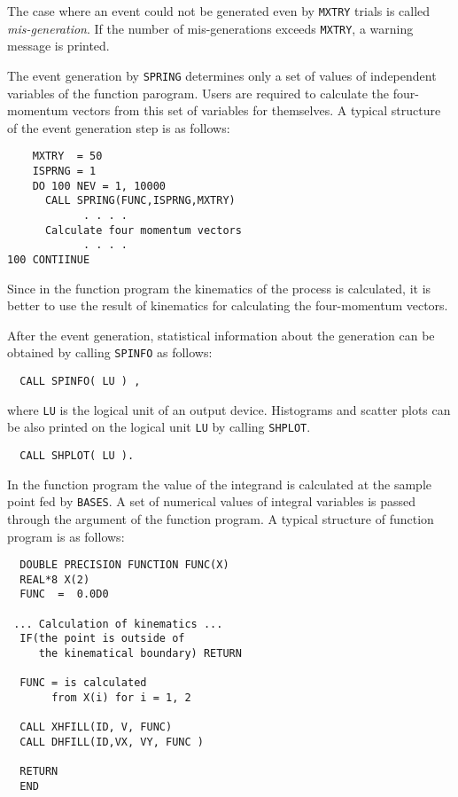 The case where an event could not be generated even by {\tt MXTRY} trials is called
{\it
 mis-generation}.
If the number of mis-generations exceeds {\tt MXTRY}, a warn\-ing message
is printed. 
\par
The event generation by {\tt SPRING} determines only a set of values of
independent variables of the function parogram.
Users are required to calculate the four-momentum vectors from this set
of variables for themselves.
A typical structure of the event generation step is as follows:
\par
\begin{center}{\footnotesize
\begin{verbatim}
    MXTRY  = 50
    ISPRNG = 1
    DO 100 NEV = 1, 10000
      CALL SPRING(FUNC,ISPRNG,MXTRY)
            . . . .
      Calculate four momentum vectors
            . . . .
100 CONTIINUE
\end{verbatim}}\end{center}
\par\noindent
Since in the function program the kinematics of the process is calculated,
it is better to use the result of kinematics for calculating the four-momentum
vectors. 
\par
After the event generation, statistical information about the generation can be
obtained by calling {\tt SPINFO} as follows:
\par
{\small
\begin{verbatim}
  CALL SPINFO( LU ) ,
\end{verbatim}}
\par\noindent
where {\tt LU} is the logical unit of an output device.
Histograms and scatter plots can be also printed on the logical unit {\tt LU}
by calling {\tt SHPLOT}. 
\par
{\small
\begin{verbatim}
  CALL SHPLOT( LU ).
\end{verbatim}}
\par \bigskip  
{}  
\par\medskip
In the function program the value of the integrand is calculated at the sample point
fed by {\tt BASES}.
 A set of numerical values of integral variables is passed through
the argument of the function program.
A typical structure of function program is as follows:
\par\begin{center}
{\footnotesize\begin{verbatim}
  DOUBLE PRECISION FUNCTION FUNC(X)
  REAL*8 X(2)
  FUNC  =  0.0D0

 ... Calculation of kinematics ...
  IF(the point is outside of
     the kinematical boundary) RETURN

  FUNC = is calculated
       from X(i) for i = 1, 2

  CALL XHFILL(ID, V, FUNC)
  CALL DHFILL(ID,VX, VY, FUNC )

  RETURN
  END
\end{verbatim}}\end{center}
